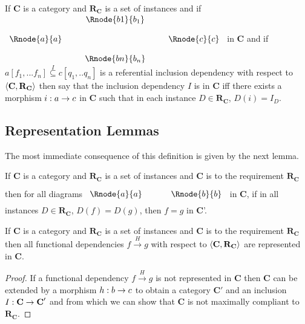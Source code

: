 \documentclass[10pt,a4paper]{article}
\theoremstyle{remark}
\newcommand{\catc}[1][C]{\textbf{#1}}
\newcommand{\catcp}[1][C]{\textbf{#1}'}
\newcommand{\reqt}{\textbf{R}}
\newcommand{\reqtc}[1][\catc]{\reqt_{#1}}
\newcommand{\fundep}[3]{#2 \xrightarrow{#1} #3}
\begin{document}
\begin{definition}
If $\catc$ is a category and $\reqtc$ is a set of instances and if
$
\begin{array}{c p{0.25cm} c  p{0.25cm} c }
             &&   \Rnode{b1}{b_1} &&              \\[0.4cm]
\Rnode{a}{a} &&                   && \Rnode{c}{c} \\[0.4cm]
             &&   \Rnode{bn}{b_n} &&              
\end{array} 
$
in $\catc$ and if $a[f_1,...f_n] \overset{I}{\subseteq} c[q_1,..q_n]$ is a referential inclusion dependency
with respect  to $\tuple{\catc,\reqtc}$ then say that the inclusion dependency $I$ is  in $\catc$
iff there exists a morphism $i:a \rightarrow c$ in $\catc$ such that in each instance $D \in \reqtc$, $D(i) = I_D$. 
\end{definition}


\subsection{Representation Lemmas}

The most immediate consequence of this definition is given by the next lemma.
\begin{lemma}
If $\catc$ is a category and $\reqtc$ is a set of instances  and $\catc$ is 
 to the requirement $\reqtc$ then
for all diagrams
$
\rule[-0.3cm]{0pt}{0.9cm} %
\begin{array}{c p{0.5cm} c  }
 \Rnode{a}{a}            &&   \Rnode{b}{b}
\end{array} 
$
in $\catc$,  if in all instances $D \in \reqtc$, $D(f)=D(g)$, 
then $f=g$ in $\catc$'.
\end{lemma}


\begin{lemma}
If $\catc$ is a category and $\reqtc$ is a set of instances  and $\catc$ is 
 to the requirement $\reqtc$ then
all functional dependencies $\fundep{H}{f}{g}$  with respect to $\tuple{\catc,\reqtc}$ are represented in $\catc$.
\end{lemma}
\begin{proof}
If a functional dependency $\fundep{H}{f}{g}$ is not represented in $\catc$ then $\catc$ can be extended by 
a morphism $h: b \rightarrow c$ to obtain a category $\catcp$ and an inclusion $I: \catc \morph \catcp$ and from which
we can show that $\catc$ is not maximally compliant to $\reqtc$.
\end{proof}
\end{document}
